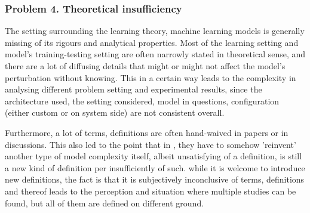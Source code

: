 \documentclass[10pt]{article}
\begin{document}
\subsubsection*{Problem 4. Theoretical insufficiency}

The setting surrounding the learning theory, machine learning models is generally missing of its rigours and analytical properties. Most of the learning setting and model's training-testing setting are often narrowly stated in theoretical sense, and there are a lot of diffusing details that might or might not affect the model's perturbation without knowing. This in a certain way leads to the complexity in analysing different problem setting and experimental results, since the architecture used, the setting considered, model in questions, configuration (either custom or on system side) are not consistent overall. 

Furthermore, a lot of terms, definitions are often hand-waived in papers or in discussions. This also led to the point that in \cite{nakkiran_deep_2019}, they have to somehow 'reinvent' another type of model complexity itself, albeit unsatisfying of a definition, is still a new kind of definition per insufficiently of such. while it is welcome to introduce new definitions, the fact is that it is subjectively inconclusive of terms, definitions and thereof leads to the perception and situation where multiple studies can be found, but all of them are defined on different ground.
\end{document}
